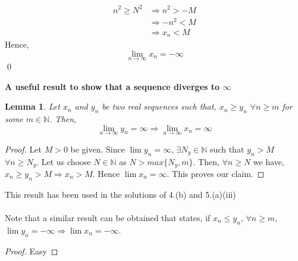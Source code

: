 \documentclass[10pt]{article}
\newtheorem*{lemma}{Lemma}
\newcommand{\nn}{\mathbb{N}}
\newcommand{\inflim}{\lim_{n\to\infty}}
\begin{document}
        \begin{align*}
            n^2 \geq N^2 &\Rightarrow n^2 > -M\\
            &\Rightarrow -n^2 < M\\
            &\Rightarrow x_n < M
        \end{align*}
        Hence, 
        $$\inflim x_n = -\infty$$\qed\\
        \begin{center}
            \Large{\textbf{A useful result to show that a sequence diverges to $\infty$}}
        \end{center}
        \begin{lemma}
             Let $x_n$ and $y_n$ be two real sequences such that, $x_n \geq y_n$ $\forall n \geq m$ for some $m \in \nn$. Then, $$\inflim y_n = \infty \Rightarrow \inflim x_n = \infty$$
        \end{lemma}
        \begin{proof}
            Let $M > 0$ be given. Since $\lim y_n = \infty$, $\exists N_y \in \nn$ such that $y_n > M$ $\forall n \geq N_y$. Let us choose $N \in \nn$ as $N > max\{N_y, m\}$. Then, $\forall n \geq N$ we have, $x_n \geq y_n>M \Rightarrow x_n > M$. Hence $\lim x_n = \infty$. This proves our claim.
        \end{proof}
        This result has been used in the solutions of 4.(b) and 5.(a)(iii) \\ \\ 
        Note that a  similar result can be obtained that states, if $x_n \leq y_n$, $\forall n \geq m$, $\lim y_n = -\infty \Rightarrow \lim x_n = -\infty$.
        \begin{proof}
            Easy
        \end{proof}
            
\end{document}
